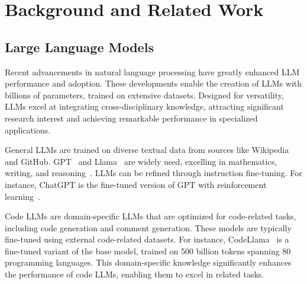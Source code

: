 \section{Background and Related Work}
\label{sec:bg}
\subsection{Large Language Models}
Recent advancements in natural language processing have greatly enhanced LLM performance and adoption. These developments enable the creation of LLMs with billions of parameters, trained on extensive datasets. Designed for versatility, LLMs excel at integrating cross-disciplinary knowledge, attracting significant research interest and achieving remarkable performance in specialized applications.

General LLMs are trained on diverse textual data from sources like Wikipedia and GitHub. GPT~\cite{brown2020language} and Llama~\cite{touvron2023llama} are widely used, excelling in mathematics, writing, and reasoning~\cite{liu2024empirical,zhao2023survey,chang2024survey}. LLMs can be refined through instruction fine-tuning. For instance, ChatGPT is the fine-tuned version of GPT with reinforcement learning~\cite{brown2020language}. 



Code LLMs are domain-specific LLMs that are optimized for code-related tasks, including code generation and comment generation. These models are typically fine-tuned using external code-related datasets. For instance, CodeLlama~\cite{roziere2023code} is a fine-tuned variant of the base model, trained on 500 billion tokens spanning 80 programming languages. This domain-specific knowledge significantly enhances the performance of code LLMs, enabling them to excel in related tasks. 

